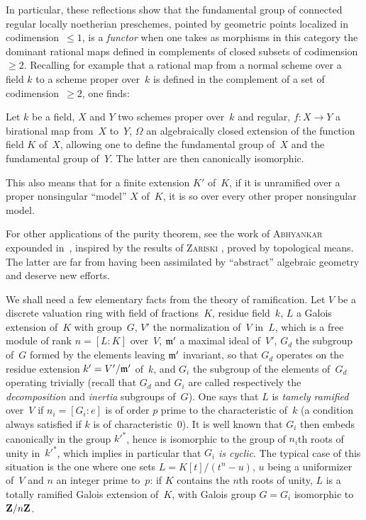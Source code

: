 In particular, these reflections show that the fundamental group
of connected regular locally noetherian preschemes,
pointed by geometric points
localized in codimension~$\le 1$, is a \emph{functor} when
one takes as morphisms in this category the dominant rational
maps defined in complements of
closed subsets of codimension~$\ge 2$. Recalling for example
that a rational map from a normal scheme over a field $k$
to a scheme proper over~$k$ is defined in the
complement of a set of codimension~$\ge 2$, one finds:

\begin{corollary}
\label{X.3.4}
Let $k$ be a field, $X$ and $Y$ two schemes proper over~$k$ and
regular, $f\colon X\to Y$ a birational map from~$X$
to~$Y$, $\Omega$ an algebraically closed extension of the
function field $K$ of~$X$, allowing one to define the fundamental group
of~$X$ and the fundamental group of~$Y$. The latter are then
canonically isomorphic.
\end{corollary}

This also means that for a finite extension $K'$ of~$K$, if it
is unramified over a proper nonsingular ``model'' $X$
of~$K$, it is so over every other proper nonsingular model.

\begin{remark}
\label{X.3.5}
For other applications of the purity theorem, see the
work
of \textsc{Abhyankar}
expounded in~\cite{X.4}, inspired by the
results of \textsc{Zariski} \cite[chap\ptbl VIII]{X.6}, proved by
topological means. The latter are far from having been assimilated
by ``abstract'' algebraic geometry and deserve
new efforts.
\end{remark}

We
shall need a few elementary facts from the theory
of ramification. Let $V$ be a discrete valuation ring with
field of fractions~$K$, residue field~$k$, $L$ a Galois
extension of~$K$ with group~$G$, $V'$ the normalization of~$V$
in~$L$, which is a free module of rank $n=[L{\colon }K]$ over~$V$,
$\mathfrak{m'}$ a maximal ideal of~$V'$, $G_d$ the subgroup of~$G$
formed by the elements leaving $\mathfrak{m'}$ invariant, so
that $G_d$ operates on the residue extension
$k'=V'/\mathfrak{m'}$ of~$k$, and $G_i$ the subgroup of the elements
of~$G_d$ operating trivially (recall that $G_d$ and $G_i$ are
called respectively the \emph{decomposition} and
\emph{inertia} subgroups of~$G$). One says that $L$ is \emph{tamely
ramified} over~$V$ if $n_i=[G_i{\colon }e]$ is of order $p$ prime
to the characteristic of~$k$ (a condition always
satisfied if $k$ is of characteristic~0). It is well
known that $G_i$ then embeds canonically in the group ${k'}^*$,
hence is isomorphic to the group of
$n_i$th roots of unity
in~${k'}^*$, which implies in particular that $G_i$ \emph{is
cyclic}. The typical case of this situation is the one where one sets
$L=K[t]/(t^n - u)$, $u$ being a uniformizer of~$V$ and $n$ an
integer prime to~$p$: if $K$ contains the $n$th roots of
unity, $L$ is a totally ramified Galois extension
of~$K$, with Galois group $G=G_i$ isomorphic to~$\mathbf{Z}/n\mathbf{Z}$.

